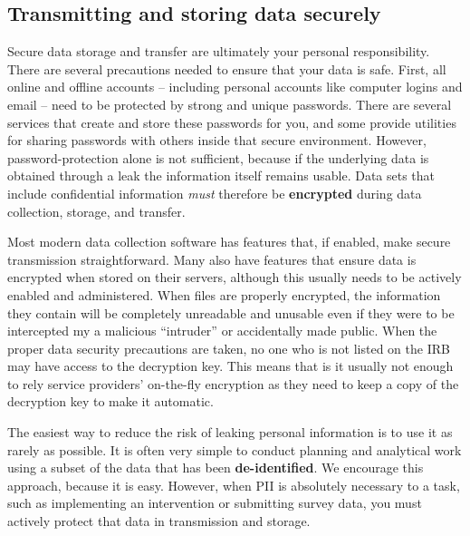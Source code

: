 \subsection{Transmitting and storing data securely}

Secure data storage and transfer are ultimately your personal responsibility.
There are several precautions needed to ensure that your data is safe.
First, all online and offline accounts
-- including personal accounts like computer logins and email --
need to be protected by strong and unique passwords.
There are several services that create and store these passwords for you,
and some provide utilities for sharing passwords with others
inside that secure environment.
However, password-protection alone is not sufficient,
because if the underlying data is obtained through a leak the information itself remains usable.
Data sets that include confidential information
\textit{must} therefore be \textbf{encrypted}
during data collection, storage, and transfer.

Most modern data collection software has features that,
if enabled, make secure transmission straightforward.
Many also have features that ensure data is encrypted when stored on their servers,
although this usually needs to be actively enabled and administered.
When files are properly encrypted,
the information they contain will be completely unreadable and unusable
even if they were to be intercepted my a malicious
``intruder'' or accidentally made public.
When the proper data security precautions are taken,
no one who is not listed on the IRB may have access to the decryption key.
This means that is it usually not
enough to rely service providers' on-the-fly encryption as they need to keep a copy
of the decryption key to make it automatic.

The easiest way to reduce the risk of leaking personal information is to use it as rarely as possible.
It is often very simple to conduct planning and analytical work
using a subset of the data that has been \textbf{de-identified}.
We encourage this approach, because it is easy.
However, when PII is absolutely necessary to a task,
such as implementing an intervention
or submitting survey data,
you must actively protect that data in transmission and storage.

